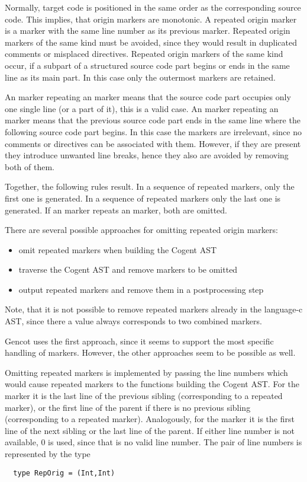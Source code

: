 Normally, target code is positioned in the same order as the corresponding source code. This implies, that
origin markers are monotonic. A repeated origin marker is a marker with the same line number as its previous marker.
Repeated origin markers of the same kind must be avoided, since they would result in duplicated comments or 
misplaced directives.
Repeated origin markers of the same kind occur, if a subpart of a structured source code part begins or ends 
in the same line as its main part. In this case only the outermost markers are retained.

An  marker repeating an  marker means that the source code
part occupies only one single line (or a part of it), this is a valid case. 
An  marker repeating an  marker means that the previous source code
part ends in the same line where the following source code part begins. In this case the markers are
irrelevant, since no comments or directives can be associated with them. However, if they are
present they introduce unwanted line breaks, hence they also are avoided by removing both of them.

Together, the following rules result. In a sequence of repeated  markers, only the first one 
is generated. In a sequence of repeated  markers only the last one is generated.
If an  marker repeats an  marker, both are omitted.

There are several possible approaches for omitting repeated origin markers:
\begin{itemize}
\item omit repeated markers when building the Cogent AST
\item traverse the Cogent AST and remove markers to be omitted
\item output repeated markers and remove them in a postprocessing step
\end{itemize}
Note, that it is not possible to remove repeated markers already in the language-c AST, since there a 
value always corresponds to two combined markers.

Gencot uses the first approach, since it seems to support the most specific handling of markers. However, the other
approaches seem to be possible as well.

Omitting repeated markers is implemented by passing the line numbers which would cause repeated markers to the 
functions building the Cogent AST. For the  marker it is the last line of the previous sibling
(corresponding to a repeated  marker), or the first line of the parent if there is no previous
sibling (corresponding to a repeated  marker). Analogously, for the  marker
it is the first line of the next sibling or the last line of the parent. If either line number is not available,
0 is used, since that is no valid line number. The pair of line numbers is represented by the type
\begin{verbatim}
  type RepOrig = (Int,Int)
\end{verbatim}

